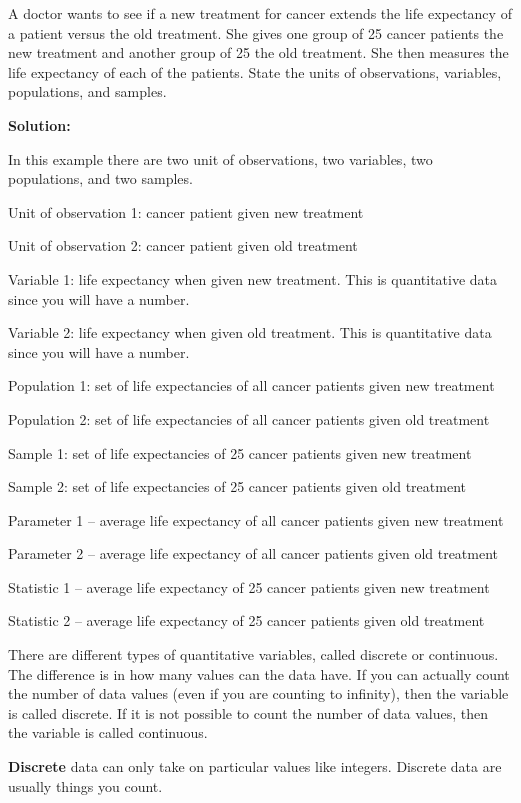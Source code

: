 \documentclass[
]{book}
\begin{document}
A doctor wants to see if a new treatment for cancer extends the life expectancy of a patient versus the old treatment. She gives one group of 25 cancer patients the new treatment and another group of 25 the old treatment. She then measures the life expectancy of each of the patients. State the units of observations, variables, populations, and samples.

\textbf{Solution:}

In this example there are two unit of observations, two variables, two populations, and two samples.

Unit of observation 1: cancer patient given new treatment

Unit of observation 2: cancer patient given old treatment

Variable 1: life expectancy when given new treatment. This is quantitative data since you will have a number.

Variable 2: life expectancy when given old treatment. This is quantitative data since you will have a number.

Population 1: set of life expectancies of all cancer patients given new treatment

Population 2: set of life expectancies of all cancer patients given old treatment

Sample 1: set of life expectancies of 25 cancer patients given new treatment

Sample 2: set of life expectancies of 25 cancer patients given old treatment

Parameter 1 -- average life expectancy of all cancer patients given new treatment

Parameter 2 -- average life expectancy of all cancer patients given old treatment

Statistic 1 -- average life expectancy of 25 cancer patients given new treatment

Statistic 2 -- average life expectancy of 25 cancer patients given old treatment

There are different types of quantitative variables, called discrete or continuous. The difference is in how many values can the data have. If you can actually count the number of data values (even if you are counting to infinity), then the variable is called discrete. If it is not possible to count the number of data values, then the variable is called continuous.

\textbf{Discrete} data can only take on particular values like integers. Discrete data are usually things you count.
\end{document}
